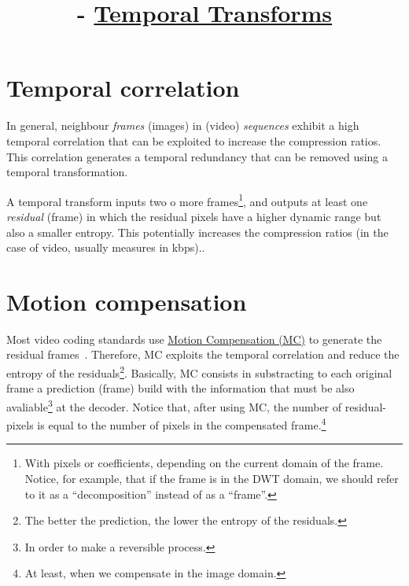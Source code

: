 


\title{\SM{} - \href{https://github.com/Sistemas-Multimedia/Sistemas-Multimedia.github.io/tree/master/contents/temporal_transforms}{Temporal Transforms}}

\maketitle
\tableofcontents

\section{Temporal correlation}

In general, neighbour \emph{frames} (images) in (video)
\emph{sequences} exhibit a high temporal correlation that can be
exploited to increase the compression ratios. This correlation
generates a temporal redundancy that can be removed using a temporal
transformation.

A temporal transform inputs two o more frames\footnote{With pixels or
  coefficients, depending on the current domain of the frame. Notice,
  for example, that if the frame is in the DWT domain, we should refer
  to it as a ``decomposition'' instead of as a ``frame''.}, and
outputs at least one \emph{residual} (frame) in which the residual
pixels have a higher dynamic range but also a smaller entropy. This
potentially increases the compression ratios (in the case of video,
usually measures in kbps)..


\section{Motion compensation}

Most video coding standards use
\href{https://en.wikipedia.org/wiki/Motion_compensation}{Motion
  Compensation (MC)} to generate the residual
frames~\cite{vruiz__MC}. Therefore, MC exploits the temporal
correlation and reduce the entropy of the residuals\footnote{The
  better the prediction, the lower the entropy of the
  residuals.}. Basically, MC consists in substracting to each original
frame a prediction (frame) build with the information that must be
also avaliable\footnote{In order to make a reversible process.} at the
decoder. Notice that, after using MC, the number of residual-pixels is
equal to the number of pixels in the compensated frame.\footnote{At
  least, when we compensate in the image domain.}

